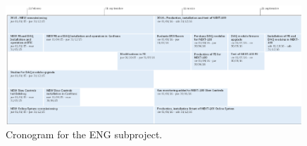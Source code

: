 \begin{figure}[h!]
\begin{center}
\includegraphics[width=0.99\textwidth]{img/ENF_CRONO.pdf}
\end{center}
\caption{\label{Fig:CronoEng} Cronogram for the ENG subproject. }
\end{figure}

%
%
%
%
